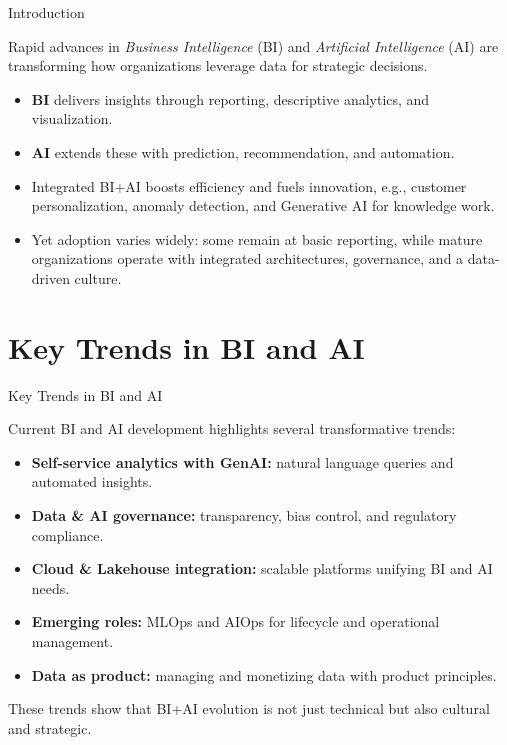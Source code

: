 \documentclass[aspectratio=169, table]{beamer}
\begin{document}
\begin{frame}{Introduction}
	\vspace{20pt}
	
	Rapid advances in \textit{Business Intelligence} (BI) and \textit{Artificial Intelligence} (AI) 
	are transforming how organizations leverage data for strategic decisions.  
	\begin{itemize}
		\item \textbf{BI} delivers insights through reporting, descriptive analytics, and visualization.  
		\item \textbf{AI} extends these with prediction, recommendation, and automation.  
		\item Integrated BI+AI boosts efficiency and fuels innovation, e.g., customer personalization, 
		anomaly detection, and Generative AI for knowledge work.  
		\item Yet adoption varies widely: some remain at basic reporting, while mature organizations 
		operate with integrated architectures, governance, and a data-driven culture.  
	\end{itemize}
	
\end{frame}

\section{Key Trends in BI and AI}

\begin{frame}{Key Trends in BI and AI}
	\vspace{20pt}
	
	Current BI and AI development highlights several transformative trends:  
	\begin{itemize}
		\item \textbf{Self-service analytics with GenAI:} natural language queries and automated insights.  
		\item \textbf{Data \& AI governance:} transparency, bias control, and regulatory compliance.  
		\item \textbf{Cloud \& Lakehouse integration:} scalable platforms unifying BI and AI needs.  
		\item \textbf{Emerging roles:} MLOps and AIOps for lifecycle and operational management.  
		\item \textbf{Data as product:} managing and monetizing data with product principles.  
	\end{itemize}
	
	These trends show that BI+AI evolution is not just technical but also cultural and strategic.
	
\end{frame}
\end{document}
